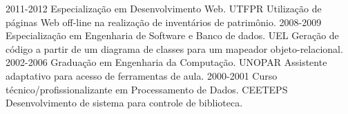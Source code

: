\documentclass[]{src/twentysecondcv}
\begin{document}
\begin{twenty}
  \twentyitem
    {2011-2012}
    {Especialização em Desenvolvimento Web.}
    {UTFPR}
    {Utilização de páginas Web off-line na realização de inventários de patrimônio.}
  \twentyitem
    {2008-2009}
    {Especialização em Engenharia de Software e Banco de dados.}
    {UEL}
    {Geração de código a partir de um diagrama de classes para um mapeador objeto-relacional.}
  \twentyitem
    {2002-2006}
    {Graduação em Engenharia da Computação.}
    {UNOPAR}
    {Assistente adaptativo para acesso de ferramentas de aula.}
  \twentyitem
    {2000-2001}
    {Curso técnico/profissionalizante em Processamento de Dados.}
    {CEETEPS}
    {Desenvolvimento de sistema para controle de biblioteca.}
\end{twenty}







\end{document}
